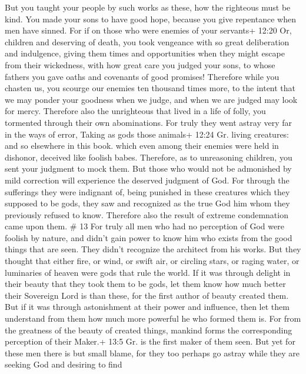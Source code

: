  But you taught your people by such works as these, how the
righteous must be kind. You made your sons to have good hope, because
you give repentance when men have sinned.  For if on those
who were enemies of your servants+ 12:20 Or, children and deserving of
death, you took vengeance with so great deliberation and indulgence,
giving them times and opportunities when they might escape from their
wickedness,  with how great care you judged your sons, to
whose fathers you gave oaths and covenants of good promises!
 Therefore while you chasten us, you scourge our enemies
ten thousand times more, to the intent that we may ponder your goodness
when we judge, and when we are judged may look for mercy. 
Therefore also the unrighteous that lived in a life of folly, you
tormented through their own abominations.  For truly they
went astray very far in the ways of error, Taking as gods those animals+
12:24 Gr. living creatures: and so elsewhere in this book. which even
among their enemies were held in dishonor, deceived like foolish babes.
 Therefore, as to unreasoning children, you sent your
judgment to mock them.  But those who would not be
admonished by mild correction will experience the deserved judgment of
God.  For through the sufferings they were indignant of,
being punished in these creatures which they supposed to be gods, they
saw and recognized as the true God him whom they previously refused to
know. Therefore also the result of extreme condemnation came upon them.
\# 13  For truly all men who had no perception of God were
foolish by nature, and didn't gain power to know him who exists from the
good things that are seen. They didn't recognize the architect from his
works.  But they thought that either fire, or wind, or swift
air, or circling stars, or raging water, or luminaries of heaven were
gods that rule the world.  If it was through delight in
their beauty that they took them to be gods, let them know how much
better their Sovereign Lord is than these, for the first author of
beauty created them.  But if it was through astonishment at
their power and influence, then let them understand from them how much
more powerful he who formed them is.  For from the greatness
of the beauty of created things, mankind forms the corresponding
perception of their Maker.+ 13:5 Gr. is the first maker of them seen.
 But yet for these men there is but small blame, for they
too perhaps go astray while they are seeking God and desiring to find
